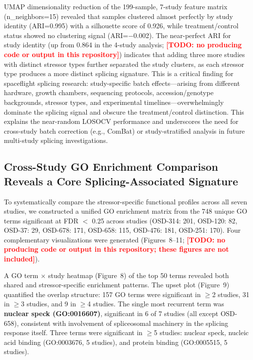 \documentclass[12pt,a4paper]{article}
\newcommand{\TODO}[1]{\textcolor{red}{\textbf{[TODO: #1]}}}
\begin{document}
UMAP dimensionality reduction of the 199-sample, 7-study feature matrix (n\_neighbors=15) revealed that samples clustered almost perfectly by study identity (ARI=0.995) with a silhouette score of 0.926, while treatment/control status showed no clustering signal (ARI=$-$0.002). The near-perfect ARI for study identity (up from 0.864 in the 4-study analysis; \TODO{no producing code or output in this repository}) indicates that adding three more studies with distinct stressor types further separated the study clusters, as each stressor type produces a more distinct splicing signature. This is a critical finding for spaceflight splicing research: study-specific batch effects---arising from different hardware, growth chambers, sequencing protocols, accession/genotype backgrounds, stressor types, and experimental timelines---overwhelmingly dominate the splicing signal and obscure the treatment/control distinction. This explains the near-random LOSOCV performance and underscores the need for cross-study batch correction (e.g., ComBat) or study-stratified analysis in future multi-study splicing investigations.

\subsection{Cross-Study GO Enrichment Comparison Reveals a Core Splicing-Associated Signature}

To systematically compare the stressor-specific functional profiles across all seven studies, we constructed a unified GO enrichment matrix from the 748 unique GO terms significant at FDR $<$ 0.25 across studies (OSD-314: 201, OSD-120: 82, OSD-37: 29, OSD-678: 171, OSD-658: 115, OSD-476: 181, OSD-251: 170). Four complementary visualizations were generated (Figures~8--11; \TODO{no producing code or output in this repository; these figures are not included}).

A GO term $\times$ study heatmap (Figure~8) of the top 50 terms revealed both shared and stressor-specific enrichment patterns. The upset plot (Figure~9) quantified the overlap structure: 157 GO terms were significant in $\geq$2 studies, 31 in $\geq$3 studies, and 9 in $\geq$4 studies. The single most recurrent term was \textbf{nuclear speck (GO:0016607)}, significant in 6 of 7 studies (all except OSD-658), consistent with involvement of spliceosomal machinery in the splicing response itself. Three terms were significant in $\geq$5 studies: nuclear speck, nucleic acid binding (GO:0003676, 5 studies), and protein binding (GO:0005515, 5 studies).
\end{document}

